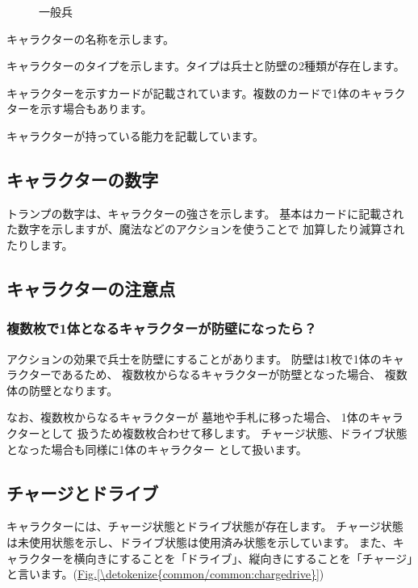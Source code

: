 \documentclass[letterpaper,10pt,dvipdfmx]{sphinxmanual}
\begin{document}
\begin{figure}[htbp]
\centering
\capstart

\noindent{}
\caption{一般兵}\label{\detokenize{common/common:id51}}\label{\detokenize{common/common:character-sample}}\end{figure}
\begin{description}
\sphinxAtStartPar
キャラクターの名称を示します。

\sphinxAtStartPar
キャラクターのタイプを示します。タイプは兵士と防壁の2種類が存在します。

\sphinxAtStartPar
キャラクターを示すカードが記載されています。複数のカードで1体のキャラクターを示す場合もあります。

\sphinxAtStartPar
キャラクターが持っている能力を記載しています。

\end{description}


\subsection{キャラクターの数字}
\label{\detokenize{common/common:id11}}
\sphinxAtStartPar
トランプの数字は、キャラクターの強さを示します。
基本はカードに記載された数字を示しますが、魔法などのアクションを使うことで
加算したり減算されたりします。


\subsection{キャラクターの注意点}
\label{\detokenize{common/common:id12}}

\subsubsection{複数枚で1体となるキャラクターが防壁になったら？}
\label{\detokenize{common/common:id13}}
\sphinxAtStartPar
アクションの効果で兵士を防壁にすることがあります。
防壁は1枚で1体のキャラクターであるため、
複数枚からなるキャラクターが防壁となった場合、
複数体の防壁となります。

\sphinxAtStartPar
なお、複数枚からなるキャラクターが
墓地や手札に移った場合、
1体のキャラクターとして
扱うため複数枚合わせて移します。
チャージ状態、ドライブ状態となった場合も同様に1体のキャラクター
として扱います。


\subsection{チャージとドライブ}
\label{\detokenize{common/common:id14}}
\sphinxAtStartPar
キャラクターには、チャージ状態とドライブ状態が存在します。
チャージ状態は未使用状態を示し、ドライブ状態は使用済み状態を示しています。
また、キャラクターを横向きにすることを「ドライブ」、縦向きにすることを「チャージ」と言います。(\hyperref[\detokenize{common/common:chargedrive}]{Fig.\@ \ref{\detokenize{common/common:chargedrive}}})
\end{document}

